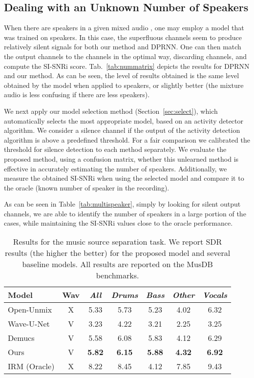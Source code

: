 \documentclass{article}
\begin{document}
\subsection{Dealing with an Unknown Number of Speakers}
When there are  speakers in a given mixed audio , one may employ a model that was trained on  speakers. In this case, the superfluous channels seem to produce relatively silent signals for both our method and DPRNN. One can then match the  output channels to the  channels in the optimal way, discarding  channels, and compute the SI-SNRi score. Tab.~\ref{tab:nummatrix} depicts the results for DPRNN and our method.  As can be seen, the level of results obtained is the same level obtained by the  model when applied to  speakers, or slightly better (the mixture audio is less confusing if there are less speakers).

We next apply our model selection method (Section~\ref{sec:select}), which automatically selects the most appropriate model, based on an activity detector algorithm. We consider a silence channel if the output of the activity detection algorithm is above a predefined threshold. For a fair comparison we calibrated the threshold for silence detection to each method separately. We evaluate the proposed method, using a confusion matrix, whether this unlearned method is effective in accurately estimating the number of speakers. Additionally, we measure the obtained SI-SNRi when using the selected model and compare it to the oracle (known number of speaker in the recording).

As can be seen in Table~\ref{tab:multispeaker}, simply by looking for silent output channels, we are able to identify the number of speakers in a large portion of the cases, while maintaining the SI-SNRi values close to the oracle performance. 

\begin{table*}[t]
    \centering
    \caption{Results for the music source separation task. We report SDR results (the higher the better) for the proposed model and several baseline models. All results are reported on the MusDB benchmarks.}
    \label{tab:music}
    \begin{tabular}{lcccccc}
    \toprule
    Model & Wav & \textit{All} & \textit{Drums} & \textit{Bass} & \textit{Other} & \textit{Vocals} \\
    \midrule
 	Open-Unmix & X & 5.33 & 5.73 & 5.23 & 4.02 & 6.32 \\
 	Wave-U-Net & V & 3.23 & 4.22 & 3.21 & 2.25 & 3.25 \\ 
 	Demucs 	   & V & 5.58 & 6.08 & 5.83 & 4.12 & 6.29 \\   
 	Ours 	   & V & \bf{5.82} & \bf{6.15} & \bf{5.88} & \bf{4.32} & \bf{6.92} \\   
	\midrule
	IRM (Oracle) & X & 8.22 & 8.45 & 4.12 & 7.85 & 9.43 \\
\bottomrule
\end{tabular}
\end{table*}
\end{document}
